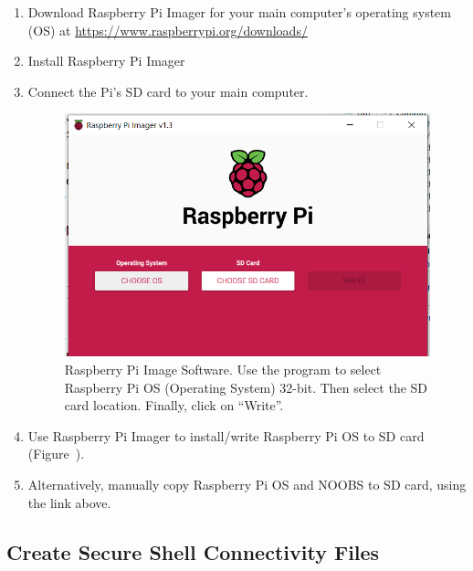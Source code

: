 \documentclass{article}
\begin{document}
\begin{enumerate}
  \item Download Raspberry Pi Imager for your main computer's operating system (OS) at \url{https://www.raspberrypi.org/downloads/}
  \item Install Raspberry Pi Imager
  \item Connect the Pi's SD card to your main computer.
  
\begin{figure}
\centering
\includegraphics[width=1.00\textwidth]{1_Pi_Imager}
\caption{Raspberry Pi Image Software. Use the program to select Raspberry Pi OS (Operating System) 32-bit. Then select the SD card location. Finally, click on ``Write''.}
\label{fig:pi_imager}
\end{figure}

  \item Use Raspberry Pi Imager to install/write Raspberry Pi OS to SD card (Figure~\label{fig:pi_imager}).
  \item Alternatively, manually copy Raspberry Pi OS and NOOBS to SD card, using the link above.
\end{enumerate}

\subsection{Create Secure Shell Connectivity Files} \label{networkssh}
\end{document}

